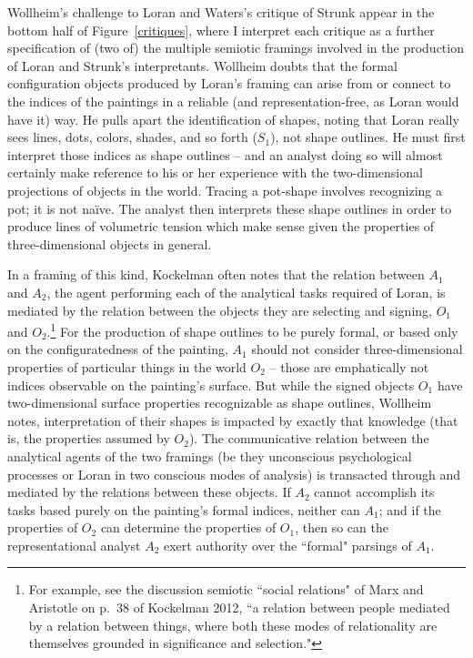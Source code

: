 Wollheim's challenge to Loran and Waters's critique of Strunk appear in the bottom half of Figure~\ref{critiques}, where I interpret each critique as a further specification of (two of) the multiple semiotic framings involved in the production of Loran and Strunk's interpretants.  Wollheim doubts that the formal configuration objects produced by Loran's framing can arise from or connect to the indices of the paintings in a reliable (and representation-free, as Loran would have it) way.  He pulls apart the identification of shapes, noting that Loran really sees lines, dots, colors, shades, and so forth ($S_1$), not shape outlines. He must first interpret those indices as shape outlines -- and an analyst doing so will almost certainly make reference to his or her experience with the two-dimensional projections of objects in the world.  Tracing a pot-shape involves recognizing a pot; it is not na\"{i}ve.  The analyst then interprets these shape outlines in order to produce lines of volumetric tension which make sense given the properties of three-dimensional objects in general.

In a framing of this kind, Kockelman often notes that the relation between $A_1$ and $A_2$, the agent performing each of the analytical tasks required of Loran, is mediated by the relation between the objects they are selecting and signing, $O_1$ and $O_2$.\footnote{For example, see the discussion semiotic ``social relations" of Marx and Aristotle on p.\ 38 of Kockelman 2012, ``a relation between people mediated by a relation between things, where both these modes of relationality are themselves grounded in significance and selection."}  For the production of shape outlines to be purely formal, or based only on the configuratedness of the painting, $A_1$ should not consider three-dimensional properties of particular things in the world $O_2$ -- those are emphatically not indices observable on the painting's surface.  But while the signed objects $O_1$ have two-dimensional surface properties recognizable as shape outlines, Wollheim notes, interpretation of their shapes is impacted by exactly that knowledge (that is, the properties assumed by $O_2$).  The communicative relation between the analytical agents of the two framings (be they unconscious psychological processes or Loran in two conscious modes of analysis) is transacted through and mediated by the relations between these objects.  If $A_2$ cannot accomplish its tasks based purely on the painting's formal indices, neither can $A_1$; and if the properties of $O_2$ can determine the properties of $O_1$, then so can the representational analyst $A_2$ exert authority over the ``formal" parsings of $A_1$.

